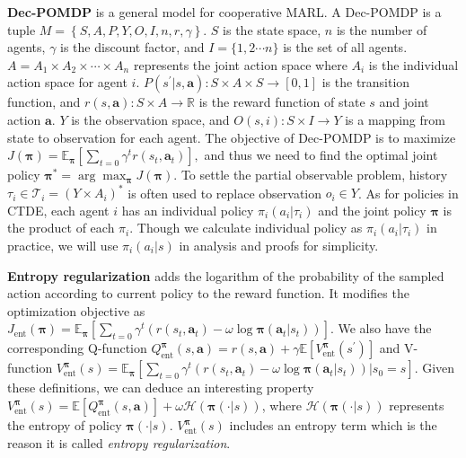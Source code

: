 \documentclass{article}
\begin{document}
\textbf{Dec-POMDP} is a general model for cooperative MARL. A Dec-POMDP is a tuple $M=\left\{S,A,P,Y,O,I,n,r,\gamma\right\}$. $S$ is the state space, $n$ is the number of agents, $\gamma$ is the discount factor, and $I = \{1,2\cdots n\}$ is the set of all agents.  $A = A_1 \times A_2 \times \cdots \times A_n$ represents the joint action space where $A_i$ is the individual action space for agent $i$. $P(s^{\prime} |s,\bm{a} ): S \times A \times S \to [0,1]$ is the transition function, and $r(s,\bm{a} ): S \times A \to \mathbb{R}$ is the reward function of state $s$ and joint action $\bm{a}$. $Y$ is the observation space, and $O(s,i):S \times I \to Y $ is a mapping from state to observation for each agent. The objective of Dec-POMDP is to maximize $J({\bm{\pi}}) = \mathbb{E}_{\bm{\pi}}\left[ \sum_{t = 0} \gamma^t r(s_t,\bm{a}_t ) \right],$ and thus we need to find the optimal joint policy ${\bm{\pi}}^{*} = \arg\max_{{\bm{\pi}}} J({\bm{\pi}})$. To settle the partial observable problem, history $\tau_i \in \mathcal{T}_i = (Y \times A_i)^*$ is often used to replace observation $o_i \in Y$. As for policies in CTDE, each agent $i$ has an individual policy $\pi_i(a_i|\tau_i)$ and the joint policy $\bm{\pi}$ is the product of each $\pi_i$. Though we calculate individual policy as $\pi_i(a_i|\tau_i)$ in practice, we will use $\pi_i(a_i|s)$ in analysis and proofs for simplicity.

\textbf{Entropy regularization} adds the logarithm of the probability of the sampled action according to current policy to the reward function. It modifies the optimization objective as 
$J_{\operatorname{ent}}(\bm{\pi}) = \mathbb{E}_{\bm{\pi}}\left[ \sum_{t = 0} \gamma^t \left( r(s_t,\bm{a}_t ) -\omega \log \bm{\pi}(\bm{a}_t|s_t) \right)  \right].$
We also have the corresponding Q-function $Q_{\operatorname{ent}}^{\bm{\pi}}(s,\bm{a}) = r(s,\bm{a}) + \gamma \mathbb{E}\left[ V_{\operatorname{ent}}^{\bm{\pi}}(s^\prime) \right]$ and V-function $V_{\operatorname{ent}}^{\bm{\pi}}(s)= \mathbb{E}_{\bm{\pi}}\left[ \sum_{t = 0} \gamma^t \left( r(s_t,\bm{a}_t ) -\omega \log \bm{\pi}(\bm{a}_t|s_t) \right) | s_0 = s \right]$.
Given these definitions, we can deduce an interesting property $V_{\operatorname{ent}}^{\bm{\pi}}(s) = \mathbb{E}\left[Q_{\operatorname{ent}}^{\bm{\pi}}(s,\bm{a})\right] + \omega \mathcal{H}\left( \bm{\pi}(\cdot|s)\right)$, where $\mathcal{H}\left( \bm{\pi}(\cdot|s)\right)$ represents the entropy of policy $\bm{\pi}(\cdot|s)$. $V_{\operatorname{ent}}^{\bm{\pi}}(s)$ includes an entropy term which is the reason it is called \textit{entropy regularization}.
\end{document}
